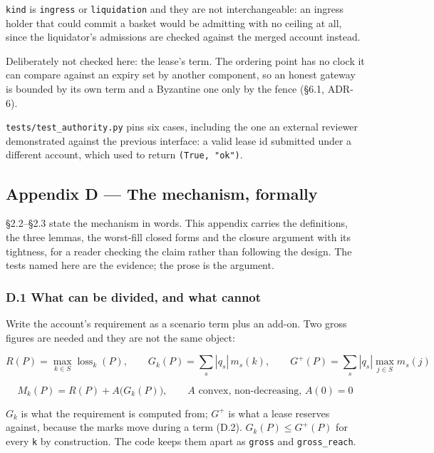 \documentclass[10pt,a4paper]{article}
\begin{document}
\texttt{kind} is \texttt{ingress} or \texttt{liquidation} and they are not interchangeable: an ingress
holder that could commit a basket would be admitting with no ceiling at all,
since the liquidator's admissions are checked against the merged account instead.

Deliberately not checked here: the lease's term. The ordering point has no clock
it can compare against an expiry set by another component, so an honest gateway
is bounded by its own term and a Byzantine one only by the fence (§6.1, ADR-6).

\texttt{tests/test\_authority.py} pins six cases, including the one an external reviewer
demonstrated against the previous interface: a valid lease id submitted under a
different account, which used to return \texttt{(True,\ "ok")}.



\label{start:13}%

\subsection{Appendix D --- The mechanism, formally}\label{appendix-d-the-mechanism-formally}

§2.2--§2.3 state the mechanism in words. This appendix carries the definitions,
the three lemmas, the worst-fill closed forms and the closure argument with its
tightness, for a reader checking the claim rather than following the design. The
tests named here are the evidence; the prose is the argument.

\subsubsection{D.1 What can be divided, and what cannot}\label{d.1-what-can-be-divided-and-what-cannot}

Write the account's requirement as a scenario term plus an add-on. Two gross
figures are needed and they are not the same object:

\[
R(P)=\max_{k\in S}\operatorname{loss}_k(P),
\qquad
G_k(P)=\sum_s |q_s|\,m_s(k),
\qquad
G^{+}(P)=\sum_s |q_s|\max_{j\in S} m_s(j)
\]

\[
M_k(P)=R(P)+A\bigl(G_k(P)\bigr),
\qquad A \text{ convex, non-decreasing, } A(0)=0
\]

\(G_k\) is what the requirement is computed from; \(G^{+}\) is what a lease reserves
against, because the marks move during a term (D.2). \(G_k(P)\le G^{+}(P)\) for every
\texttt{k} by construction. The code keeps them apart as \texttt{gross} and \texttt{gross\_reach}.
\end{document}
